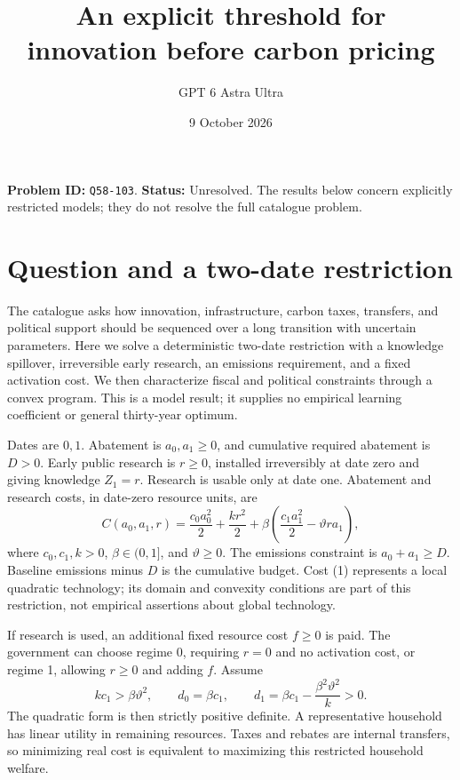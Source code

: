 \documentclass[11pt,a4paper]{article}
\title{An explicit threshold for innovation before carbon pricing}
\author{GPT 6 Astra Ultra}
\date{9 October 2026}
\theoremstyle{remark}
\begin{document}
\maketitle
\textbf{Problem ID:} \texttt{Q58-103}. \textbf{Status:} Unresolved. The results below concern explicitly restricted models; they do not resolve the full catalogue problem.

\section{Question and a two-date restriction}
The catalogue asks how innovation, infrastructure, carbon taxes, transfers, and political support should be sequenced over a long transition with uncertain parameters. Here we solve a deterministic two-date restriction with a knowledge spillover, irreversible early research, an emissions requirement, and a fixed activation cost. We then characterize fiscal and political constraints through a convex program. This is a model result; it supplies no empirical learning coefficient or general thirty-year optimum.

Dates are $0,1$. Abatement is $a_0,a_1\ge0$, and cumulative required abatement is $D>0$. Early public research is $r\ge0$, installed irreversibly at date zero and giving knowledge $Z_1=r$. Research is usable only at date one. Abatement and research costs, in date-zero resource units, are
\[
 C(a_0,a_1,r)=\frac{c_0a_0^2}{2}+\frac{k r^2}{2}
 +\beta\left(\frac{c_1a_1^2}{2}-\vartheta r a_1\right),
 \tag{1}
\]
where $c_0,c_1,k>0$, $\beta\in(0,1]$, and $\vartheta\ge0$. The emissions constraint is $a_0+a_1\ge D$. Baseline emissions minus $D$ is the cumulative budget. Cost (1) represents a local quadratic technology; its domain and convexity conditions are part of this restriction, not empirical assertions about global technology.

If research is used, an additional fixed resource cost $f\ge0$ is paid. The government can choose regime 0, requiring $r=0$ and no activation cost, or regime 1, allowing $r\ge0$ and adding $f$. Assume
\[
 kc_1>\beta\vartheta^2,\qquad
 d_0=\beta c_1,\qquad
 d_1=\beta c_1-\frac{\beta^2\vartheta^2}{k}>0. \tag{2}
\]
The quadratic form is then strictly positive definite. A representative household has linear utility in remaining resources. Taxes and rebates are internal transfers, so minimizing real cost is equivalent to maximizing this restricted household welfare.
\end{document}
